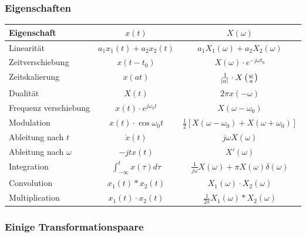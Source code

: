 \documentclass[a4paper]{article}
\begin{document}
\begin{twocolumn}
\subsubsection{Eigenschaften}
\begin{tabular}{lcc}
  Eigenschaft & $x(t)$ & $X(\omega)$ \\
  \toprule
  Linearität & $a_1 x_1(t) + a_2 x_2(t)$ & $a_1 X_1(\omega) + a_2 X_2(\omega)$ \\
  Zeitverschiebung & $x(t-t_0)$ & $X(\omega) \cdot e^{-j \omega t_0}$ \\
  Zeitskalierung & $x(at)$ & $\frac{1}{\abs{a}} \cdot X\left(\frac{\omega}{a}\right)$ \\
  Dualität & $X(t)$ & $2 \pi x(-\omega)$ \\
  Frequenz verschiebung & $x(t) \cdot e^{j \omega_0 t}$ & $X(\omega - \omega_0)$ \\
  Modulation & $x(t) \cdot \cos \omega_0 t$ & $\frac{1}{2} \left[ X(\omega - \omega_0) + X(\omega + \omega_0) \right]$ \\
  Ableitung nach $t$ & $\dot{x}(t)$ & $j \omega X(\omega)$ \\
  Ableitung nach $\omega$ & $-j t x(t)$ & $X'(\omega)$ \\
  Integration & $\int_{-\infty}^t x(\tau) d\tau$ & $\frac{1}{j\omega} X(\omega) + \pi X(\omega) \delta(\omega)$  \\
  Convolution & $x_1(t) \ast x_2(t)$ & $X_1(\omega) \cdot X_2(\omega)$ \\
  Multiplication & $x_1(t) \cdot x_2(t)$ & $\frac{1}{2\pi} X_1(\omega) \ast X_2(\omega)$ 
\end{tabular}

\subsubsection{Einige Transformationspaare}


\end{twocolumn}
\end{document}
